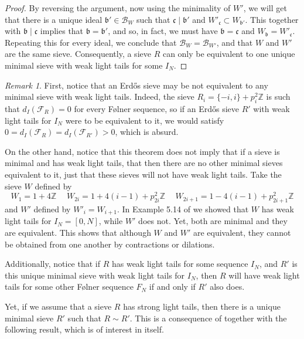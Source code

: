 \documentclass[a4paper,11pt,reqno]{amsart}
\theoremstyle{plain}
\theoremstyle{remark}
\newtheorem{remark}[theorem]{Remark}
\newcommand{\z}{\mathbb{Z}}
\newcommand{\cb}{\mathcal{B}}
\newcommand{\fr}{\mathcal{F}_R}
\newcommand{\frp}{\mathcal{F}_{R'}}
\newcommand{\gb}{\mathfrak{b}}
\newcommand{\gc}{\mathfrak{c}}
\begin{document}
\begin{proof}
			By reversing the argument, now using the minimality of $W'$, we will get that there is a unique ideal $\gb' \in \cb_W$ such that $\gc \mid \gb'$ and $W'_\gc \subset W_{\gb'}$. This together with $\gb \mid \gc$ implies that $\gb = \gb'$, and so, in fact, we must have $\gb = \gc$ and $W_\gb = W'_\gc$. Repeating this for every ideal, we conclude that $\cb_W = \cb_{W'}$, and that $W$ and $W'$ are the same sieve. Consequently, a sieve $R$ can only be equivalent to one unique minimal sieve with weak light tails for some $I_N$.                            
		\end{proof}
		
		\begin{remark}
			\label{rmk: equivalent sieves with and without weak light tails}
			First, notice that an Erdős sieve may be not equivalent to any minimal sieve with weak light tails. Indeed, the sieve $R_i = \{-i,i\} +p_i^2\z$ is such that $d_I(\fr) = 0$ for every Følner sequence, so if an Erdős sieve $R'$ with weak light tails for $I_N$ were to be equivalent to it, we would satisfy $0 = d_I(\fr) = d_I(\frp) >0$, which is absurd.
			
			On the other hand, notice that this theorem does not imply that if a sieve is minimal and has weak light tails, that then  there are no other minimal sieves equivalent to it, just that these sieves will not have weak light tails. Take the sieve $W$ defined by $$W_1 = 1+4\z \hspace{15pt} W_{2i} = 1+4(i-1) +p_{2i}^2\z \hspace{15pt}  W_{2i+1} = 1-4(i-1)+p_{2i+1}^2\z$$ and $W'$ defined by $W'_i = W_{i+1}$. In Example 5.14 of \cite{part1} we showed that $W$ has weak light tails for $I_N = [0,N]$, while $W'$ does not. Yet, both are minimal and they are equivalent. This shows that although $W$ and $W'$ are equivalent, they cannot be obtained from one another by contractions or dilations.
			
			Additionally, notice that if $R$ has weak light tails for some sequence $I_N$, and $R'$ is this unique minimal sieve with weak light tails for $I_N$, then $R$ will have weak light tails for some other Følner sequence $F_N$ if and only if $R'$ also does.
		\end{remark}
		
		Yet, if we assume that a sieve $R$ has strong light tails, then there is a unique minimal sieve $R'$ such that $R \sim R'$. This is a consequence of   together with the following result, which is of interest in itself.
		
\end{document}
